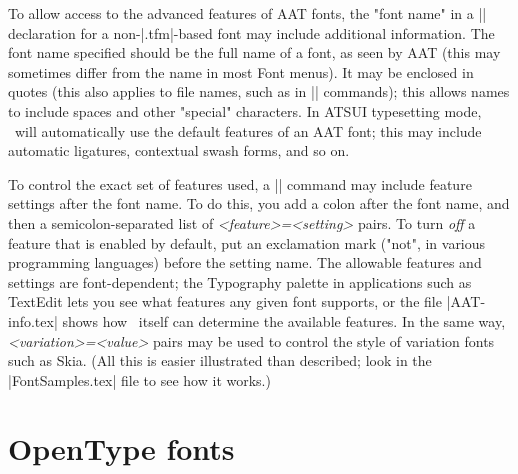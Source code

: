 To allow access to the advanced features of AAT fonts, the "font name" in a |\font| declaration for a non-|.tfm|-based font may include additional information. The font name specified should be the full name of a font, as seen by AAT (this may sometimes differ from the name in most Font menus). It may be enclosed in quotes (this also applies to file names, such as in || commands); this allows names to include spaces and other "special" characters. In ATSUI typesetting mode, \XeTeX\ will automatically use the default features of an AAT font; this may include automatic ligatures, contextual swash forms, and so on.

To control the exact set of features used, a |\font| command may include feature settings after the font name. To do this, you add a colon after the font name, and then a semicolon-separated list of {\em <feature>=<setting>} pairs. To turn {\em off} a feature that is enabled by default, put an exclamation mark ("not", in various programming languages) before the setting name. The allowable features and settings are font-dependent; the Typography palette in applications such as TextEdit lets you see what features any given font supports, or the file |AAT-info.tex| shows how \XeTeX\ itself can determine the available features. In the same way, {\em <variation>=<value>} pairs may be used to control the style of variation fonts such as Skia. (All this is easier illustrated than described; look in the |FontSamples.tex| file to see how it works.)

\section{OpenType fonts}

